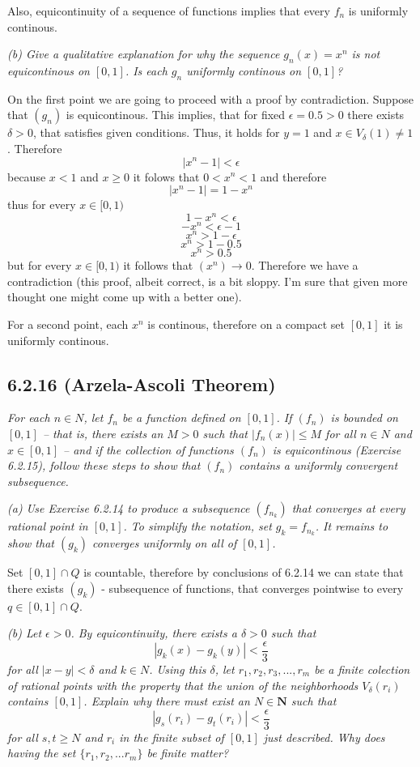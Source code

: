 \documentclass[11pt,oneside,titlepage]{book}
\begin{document}
Also, equicontinuity of a sequence of functions implies that every
$f_n$ is uniformly continous.

\textit{(b) Give a qualitative explanation for why the sequence $g_n(x) = x^n$
  is not equicontinous on $[0, 1]$. Is each $g_n$ uniformly continous on
  $[0, 1]$?}

On the first point we are going to proceed with a proof by contradiction.
Suppose that $(g_n)$ is equicontinous. This implies, that for fixed
$\epsilon = 0.5 > 0$ there exists $\delta > 0$, that
satisfies given conditions.
Thus, it holds for  $y = 1$ and $x \in V_\delta(1) \neq 1$. Therefore
$$|x^n - 1| < \epsilon$$
because $x < 1$ and $x \geq 0$ it folows that $0 < x^n < 1$ and therefore
$$|x^n - 1| = 1 - x^n$$
thus for every $x \in [0, 1)$
$$1 - x^n < \epsilon$$
$$- x^n < \epsilon - 1$$
$$x^n > 1 - \epsilon$$
$$x^n > 1 - 0.5$$
$$x^n > 0.5$$
but for every $x \in [0, 1)$ it follows that $(x^n) \to 0$. Therefore we
have a contradiction (this proof, albeit correct, is a bit sloppy. I'm sure
that given more thought one might come up with a better one).

For a second point, each $x^n$ is continous, therefore on a compact set
$[0, 1]$ it is uniformly continous.

\subsection*{6.2.16 (Arzela-Ascoli Theorem)}
\textit{For each $n \in N$, let $f_n$ be a function defined on $[0, 1]$. If
  $(f_n)$ is bounded on $[0, 1]$ -- that is, there exists an $M > 0$ such that
  $|f_n(x)| \leq M$ for all $n \in N$ and $x \in [0, 1]$ -- and if the
  collection of functions $(f_n)$ is equicontinous (Exercise 6.2.15),
  follow these steps to show
  that $(f_n)$ contains a uniformly convergent subsequence.}

\textit{(a) Use Exercise 6.2.14 to produce a subsequence $(f_{n_k})$ that
  converges at every rational point in $[0, 1]$. To simplify the notation,
  set $g_k = f_{n_k}$. It remains to show that $(g_k)$ converges uniformly on
  all of $[0, 1]$.}

Set $[0, 1] \cap Q$ is countable, therefore by conclusions of 6.2.14 we
can state that there exists $(g_k)$ - subsequence of functions, that
converges pointwise to every $q \in [0, 1] \cap Q$.

\textit{(b) Let $\epsilon > 0$. By equicontinuity, there exists a
  $\delta > 0$ such that}
$$|g_k(x) - g_k(y)| < \frac{\epsilon}{3}$$
\textit{for all $|x - y| < \delta$ and $k \in N$. Using this $\delta$, let
  $r_1, r_2, r_3, ..., r_m$ be a finite colection of rational points with the
  property that the union of the neighborhoods $V_\delta(r_i)$ contains
  $[0, 1]$. Explain why there must exist an $N \in \textbf{N}$ such that
}
$$|g_s(r_i) - g_t(r_i)| < \frac{\epsilon}{3}$$
\textit{for all $s, t \geq N$ and $r_i$ in the finite subset of $[0, 1]$
  just described. Why does having the set $\{r_1, r_2, ... r_m\}$ be finite
  matter?}
\end{document}
